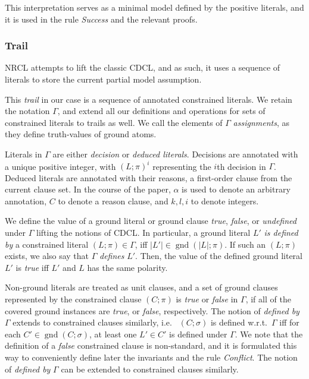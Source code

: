 \documentclass[a4paper]{article}
\newcommand{\mGnd}{\operatorname{gnd}} \newcommand{\mLVar}{\operatorname{lvar}} \newcommand{\mRVar}{\operatorname{rvar}} \newcommand{\mDmn}{\operatorname{dom}} \newcommand{\mRng}{\operatorname{rng}} \newcommand{\mMGU}{\operatorname{mgu}} \newcommand{\mDef}{\operatorname{def}} \newcommand{\mDomain}{\mathcal{D}} \newcommand{\mVar}{\operatorname{var}}
\newcommand{\ie}{i.e.\ }
\newcommand{\wrt}{w.r.t.\ }
\begin{document}
This interpretation serves as a minimal model defined by the positive literals, and it is
used in the rule \emph{Success} and the relevant proofs.

\subsubsection*{Trail}

NRCL attempts to lift the classic CDCL, and as such, it uses a sequence of literals to store the current partial model assumption. 

This \emph{trail} in our case is a sequence of annotated constrained literals. 
We retain the notation $\Gamma$, and extend all our definitions and operations for sets of constrained literals to trails as well. 
We call the elements of $\Gamma$ \emph{assignments}, as they define truth-values of ground atoms.

Literals in $\Gamma$ are either \emph{decision} or \emph{deduced literals}. Decisions are annotated with a unique positive integer, with $(L; \pi)^i$
representing the $i$th decision in $\Gamma$. 
Deduced literals are annotated with their reasons, a first-order clause from the current clause set.
In the course of the paper, $\alpha$ is used to denote an arbitrary annotation, $C$ to denote a reason clause, and $k, l, i$ to denote integers.

We define the value of a ground literal or ground clause \emph{true}, \emph{false}, or \emph{undefined} under $\Gamma$
lifting the notions of CDCL. 
In particular, a ground literal $L'$ \emph{is defined by} a constrained literal $(L; \pi) \in \Gamma$, iff
$|L'| \in \mGnd(|L|;\pi)$. If such an $(L; \pi)$ exists, we also say that $\Gamma$ \emph{defines} $L'$.
Then, the value of the defined ground literal $L'$ is \emph{true} iff $L'$ and $L$ has the same polarity.

Non-ground literals are treated as unit clauses, and a set of ground clauses represented 
by the constrained clause $(C; \pi)$ is \emph{true} or \emph{false} in $\Gamma$, 
if all of the covered ground 
instances are \emph{true}, or \emph{false}, respectively.
The notion of \emph{defined by} $\Gamma$ extends to constrained clauses similarly, \ie
$(C; \sigma)$ is defined \wrt $\Gamma$ iff for each $C' \in \mGnd(C; \sigma)$, at least 
one $L' \in C'$ is defined under $\Gamma$.
We note that the definition of a \emph{false} constrained clause is non-standard, and 
it is formulated this way to conveniently define later the invariants and the rule \emph{Conflict}.
The notion of \emph{defined by} $\Gamma$ can be extended to constrained clauses similarly.
\end{document}
